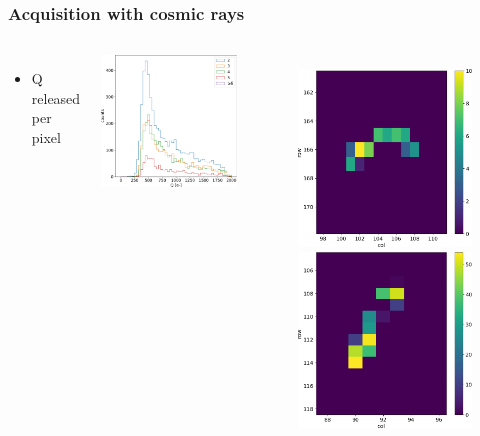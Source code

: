     \begin{frame}
        \frametitle{Acquisition with cosmic rays}
        \begin{columns}
                \begin{itemize}
                    \item Q released per pixel
                \end{itemize}
                \bigskip
                \includegraphics[width=1.1\linewidth]{figures/charaterization/cosmic_rays_spectrum_per_pixel.pdf} 
                \begin{figure}
                    \includegraphics[width=.3\linewidth]{figures/charaterization/evts/cosmic_rays/11a.png}
                    \includegraphics[width=.3\linewidth]{figures/charaterization/evts/cosmic_rays/12.png} 

\end{figure}
\end{columns}
\end{frame}

